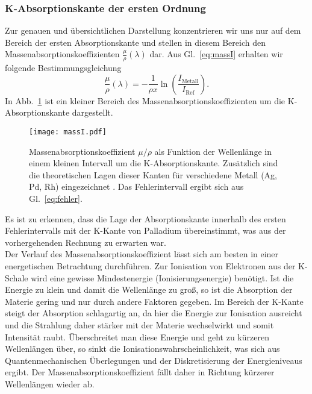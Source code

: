 \subsubsection{K-Absorptionskante der ersten Ordnung}
Zur genauen und übersichtlichen Darstellung konzentrieren wir uns nur auf dem Bereich der ersten Absorptionskante
und stellen in diesem Bereich den Massenabsorptionskoeffizienten $\frac{\mu}{\rho}(\lambda)$ dar. 
Aus Gl.~\eqref{eq:massI} erhalten wir folgende Bestimmungsgleichung
\begin{equation}
    \frac{\mu}{\rho}(\lambda) = -\frac{1}{\rho x}\ln\left(\frac{I_{\text{Metall}}}{I_{\text{Ref}}}\right).
\end{equation}
In Abb.~\ref{fig:massI} ist ein kleiner Bereich des Massenabsorptionskoeffizienten 
um die K-Absorptionskante dargestellt.
\begin{figure}[h!]
    \centering
    \texttt{[image: massI.pdf]}
    \caption{\label{fig:massI}Massenabsorptionskoeffizient $\mu/\rho$ als Funktion der Wellenlänge in einem 
    kleinen Intervall um die K-Absorptionskante. Zusätzlich sind die theoretischen 
    Lagen dieser Kanten für verschiedene Metall (Ag, Pd, Rh) eingezeichnet \cite{Database}. 
    Das Fehlerintervall ergibt sich aus Gl.~\eqref{eq:fehler}.}
\end{figure} \FloatBarrier
Es ist zu erkennen, dass die Lage der Absorptionskante innerhalb des ersten Fehlerintervalls 
mit der K-Kante von Palladium übereinstimmt, was aus der vorhergehenden Rechnung zu erwarten 
war. \\
Der Verlauf des Massenabsorptionskoeffizient lässt sich am besten in einer energetischen 
Betrachtung durchführen. Zur Ionisation von Elektronen aus der K-Schale wird eine 
gewisse Mindestenergie (Ionisierungsenergie) benötigt. Ist die Energie zu klein und damit 
die Wellenlänge zu groß, so ist die Absorption der Materie gering und nur durch andere 
Faktoren gegeben. Im Bereich der K-Kante steigt der Absorption schlagartig an, da hier 
die Energie zur Ionisation ausreicht und die Strahlung daher stärker mit der Materie wechselwirkt 
und somit Intensität raubt. Überschreitet man diese Energie und geht zu kürzeren Wellenlängen über,
so sinkt die Ionisationswahrscheinlichkeit, was sich aus Quantenmechanischen Überlegungen und 
der Diskretisierung der Energieniveaus ergibt. Der Massenabsorptionskoeffizient fällt daher 
in Richtung kürzerer Wellenlängen wieder ab. \\
